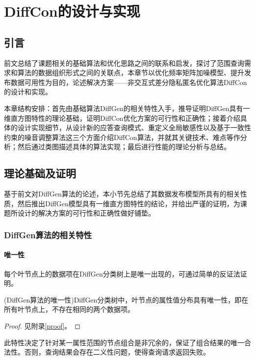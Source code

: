 
\raggedbottom
\chapter{DiffCon的设计与实现}
\label{chap:designandimpl}

\section{引言}

前文总结了课题相关的基础算法和优化思路之间的联系和启发，探讨了范围查询需求和算法的数据组织形式之间的关联点，本章节以优化频率矩阵加噪模型、提升发布数据可用性为目的，论述解决方案——非交互式差分隐私匿名优化算法DiffCon的设计和实现。

本章结构安排：首先由基础算法DiffGen的相关特性入手，推导证明DiffGen具有一维直方图特性的理论基础，证明DiffCon优化方案的可行性和正确性；接着介绍具体的设计实现细节，从设计新的应答查询模式、重定义全局敏感性以及基于一致性约束的噪音调整算法这三个方面介绍DiffCon算法，并就其关键技术、难点等作分析；然后通过类图描述具体的算法实现；最后进行性能的理论分析与总结。

\section{理论基础及证明}

基于前文对DiffGen算法的论述，本小节先总结了其数据发布模型所具有的相关性质，然后推出DiffGen模型具有一维直方图特性的结论，并给出严谨的证明，为课题所设计的解决方案的可行性和正确性做好铺垫。

\subsection{DiffGen算法的相关特性}

\subsubsection{唯一性}

每个叶节点上的数据项在DiffGen分类树上是唯一出现的，可通过简单的反证法证明。
\begin{prop}
	\label{chap4_prop1}
	(DiffGen算法的唯一性)DiffGen分类树中，叶节点的属性值分布具有唯一性，即在所有叶节点上，不存在相同的两个数据项。
\end{prop}
\begin{proof}
	见附录\ref{proof}。
\end{proof}
此特性决定了针对某一属性范围的节点组合是非冗余的，保证了组合结果的唯一合法性。否则，查询结果会存在二义性问题，使得查询请求返回失败。


